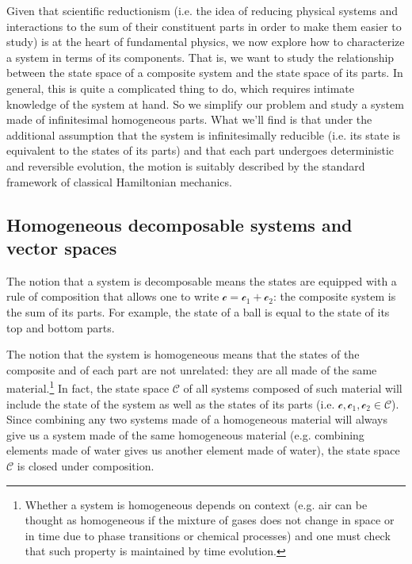 \documentclass[aps,pra,10pt,twocolumn,floatfix,nofootinbib]{revtex4-1}
\numberwithin{equation}{section}
\theoremstyle{definition}
\begin{document}

Given that scientific reductionism (i.e. the idea of reducing physical systems and interactions to the sum of their constituent parts in order to make them easier to study) is at the heart of fundamental physics, we now explore how to characterize a system in terms of its components. That is, we want to study the relationship between the state space of a composite system and the state space of its parts. In general, this is quite a complicated thing to do, which requires intimate knowledge of the system at hand. So we simplify our problem and study a system made of infinitesimal homogeneous parts. What we'll find is that under the additional assumption that the system is infinitesimally reducible (i.e. its state is equivalent to the states of its parts) and that each part undergoes deterministic and reversible evolution, the motion is suitably described by the standard framework of classical Hamiltonian mechanics.

\subsection{Homogeneous decomposable systems and vector spaces}
The notion that a system is decomposable means the states are equipped with a rule of composition that allows one to write $\mathcal{c}=\mathcal{c}_1+\mathcal{c}_2$: the composite system is the sum of its parts. For example, the state of a ball is equal to the state of its top and bottom parts.

The notion that the system is homogeneous means that the states of the composite and of each part are not unrelated: they are all made of the same material.\footnote{Whether a system is homogeneous depends on context (e.g. air can be thought as homogeneous if the mixture of gases does not change in space or in time due to phase transitions or chemical processes) and one must check that such property is maintained by time evolution.} In fact, the state space $\mathcal{C}$ of all systems composed of such material will include the state of the system as well as the states of  its parts (i.e. $\mathcal{c}, \mathcal{c}_1, \mathcal{c}_2 \in \mathcal{C}$). Since combining any two systems made of a homogeneous material will always give us a system made of the same homogeneous material (e.g. combining elements made of water gives us another element made of water), the state space $\mathcal{C}$ is closed under composition.
\end{document}
